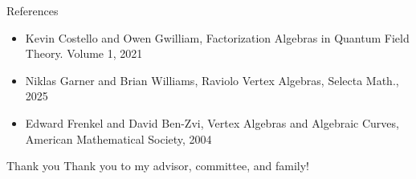 \documentclass{beamer}
\begin{document}
\begin{frame}{References}
    \begin{itemize}
\item Kevin Costello and Owen Gwilliam, Factorization Algebras in Quantum Field Theory. Volume 1, 2021
\item Niklas Garner and Brian Williams, Raviolo Vertex Algebras, Selecta Math., 2025
\item Edward Frenkel and David Ben-Zvi, Vertex Algebras and Algebraic Curves, American Mathematical Society, 2004
    \end{itemize}
\end{frame}

\begin{frame}{Thank you}
Thank you to my advisor, committee, and family!
\end{frame}
\end{document}
